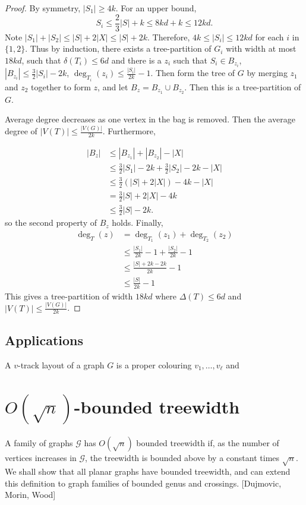 \documentclass[]{article}
\theoremstyle{definition}
\numberwithin{theorem}{section}
\numberwithin{equation}{section}
\begin{document}
\begin{proof}
	By symmetry, $|S_1| \geq 4k$. For an upper bound, \[S_i \leq \frac{2}{3} |S| + k \leq 8kd + k \leq 12kd.\]
	Note $|S_1| + |S_2| \leq |S| + 2 |X| \leq |S| + 2k$. 
	Therefore, $4k \leq |S_i| \leq 12kd$ for each $i$ in $\lbrace 1, 2 \rbrace$. Thus by induction, there exists a tree-partition of $G_i$ with width at most $18kd$, such that $\delta(T_i) \leq 6d$ and there is a $z_i$ such that $S_i \in B_{z_i}$, $|B_{z_i}| \leq \frac{3}{2} |S_i| - 2k$, $\deg_{T_i}(z_i) \leq \frac{|S_i|}{2k} - 1$. Then form the tree of $G$ by merging $z_1$ and $z_2$ together to form $z$, and let $B_z = B_{z_1} \cup B_{z_2}$. Then this is a tree-partition of $G$. 
	\par
	Average degree decreases as one vertex in the bag is removed. Then the average degree of $|V(T)| \leq \frac{|V(G)|}{2k}$. Furthermore,

	\begin{align*}
		|B_z| &\leq |B_{z_1}| + |B_{z_2}| - |X|\\
		&\leq \frac{3}{2}|S_1| - 2k + \frac{3}{2} |S_2| - 2k - |X|\\
		&\leq \frac{3}{2}(|S| + 2|X|) - 4k - |X|\\
		&= \frac{3}{2}|S| + 2|X| - 4k\\
		&\leq \frac{3}{2} |S| - 2k.
	\end{align*}
	so the second property of $B_z$ holds. Finally,
	\begin{align*}
		\deg_T(z) &= \deg_{T_1}(z_1) + \deg_{T_2}(z_2)\\
		&\leq \frac{|S_1|}{2k} - 1+ \frac{|S_2|}{2k} - 1\\
		&\leq \frac{|S| + 2k - 2k}{2k} - 1\\
		&\leq \frac{|S|}{2k} - 1
	\end{align*}
	This gives a tree-partition of width $18kd$ where $\Delta(T) \leq 6d$ and $|V(T)| \leq \frac{|V(G)|}{2k}$. 

\end{proof}

\subsection{Applications}

A $v$-track layout of a graph $G$ is a proper colouring $v_1, \ldots, v_\ell$ and 

\section{$O(\sqrt{n})$-bounded treewidth}
A family of graphs $\mathcal{G}$ has $O(\sqrt{n})$ bounded treewidth if, as the number of vertices increases in $\mathcal{G}$, the treewidth is bounded above by a constant times $\sqrt{n}$. We shall show that all planar graphs have bounded treewidth, and can extend this definition to graph families of bounded genus and crossings. [Dujmovic, Morin, Wood] 
\end{document}
